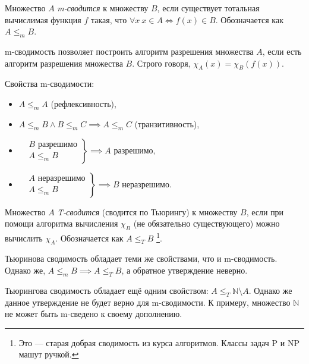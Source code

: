 \documentclass{article}
\begin{document}
    \begin{definition}
        Множество \(A\) \textit{m-сводится} к множеству \(B\), если существует тотальная вычислимая
        функция \(f\) такая, что \(\forall x \ x \in A \iff f(x) \in B\). Обозначается как \(A
        \leqslant_m B\).
    \end{definition}

    m-сводимость позволяет построить алгоритм разрешения множества \(A\), если есть алгоритм
    разрешения множества \(B\). Строго говоря, \(\chi_A(x) = \chi_B(f(x))\).

    Свойства m-сводимости:
    \begin{itemize}
        \item \(A \leqslant_m A\) (рефлексивность),
        \item \(A \leqslant_m B \wedge B \leqslant_m C \implies A \leqslant_m C\) (транзитивность),
        \item
        \(
        \left.\begin{aligned}
                &B \text{ разрешимо}\\
                &A \leqslant_m B
        \end{aligned}\right\}
        \implies A \text{ разрешимо},
        \)
        \item
        \(
        \left.\begin{aligned}
                &A \text{ неразрешимо}\\
                &A \leqslant_m B
        \end{aligned}\right\}
        \implies B \text{ неразрешимо}.
        \)
    \end{itemize}

    \begin{definition}
        Множество \(A\) \textit{T-сводится} (сводится по Тьюрингу) к множеству \(B\), если при помощи
        алгоритма вычисления \(\chi_B\) (не обязательно существующего) можно вычислить \(\chi_A\).
        Обозначается как \(A \leqslant_T B\) \footnote{Это --- старая добрая сводимость из курса
        алгоритмов. Классы задач P и NP машут ручкой.}.
    \end{definition}

    Тьюринова сводимость обладает теми же свойствами, что и m-сводимость. Однако же, \(A \leqslant_m
    B \implies A \leqslant_T B\), а обратное утверждение неверно.

    Тьюрингова сводимость обладает ещё одним свойством: \(A \leqslant_T \mathbb{N} \setminus A\).
    Однако же данное утверждение не будет верно для m-сводимости. К примеру, множество \(\mathbb{N}\)
    не может быть m-сведено к своему дополнению.
\end{document}
